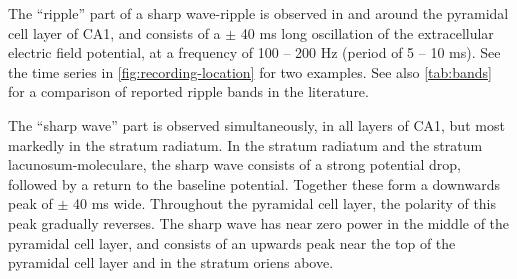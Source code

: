The ``ripple'' part of a sharp wave-ripple is observed in and around the pyramidal cell layer of CA1, and consists of a $\pm$ 40 ms long oscillation of the extracellular electric field potential, at a frequency of 100 -- 200 Hz (period of 5 -- 10 ms). See the time series in \cref{fig:recording-location} for two examples. See also \cref{tab:bands} for a comparison of reported ripple bands in the literature.

The ``sharp wave'' part is observed simultaneously, in all layers of CA1, but most markedly in the stratum radiatum. In the stratum radiatum and the stratum lacunosum-moleculare, the sharp wave consists of a strong potential drop, followed by a return to the baseline potential. Together these form a downwards peak of $\pm$ 40 ms wide. Throughout the pyramidal cell layer, the polarity of this peak gradually reverses. The sharp wave has near zero power in the middle of the pyramidal cell layer, and consists of an upwards peak near the top of the pyramidal cell layer and in the stratum oriens above.
